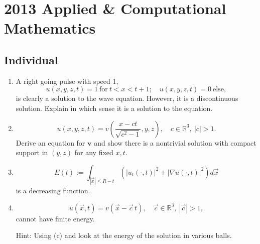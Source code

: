 \section{2013 Applied \& Computational Mathematics}

\subsection{Individual}

\begin{exercise}
\label{applied:2013:1}

\begin{enumerate}
\item[(a)] A right going pulse with speed 1,
\[
u(x,y,z,t)=1\ \text{for}\ t<x<t+1;\quad u(x,y,z,t)=0\ \text{else},
\]
is clearly a solution to the wave equation. However, it is a discontinuous solution. Explain in which sense it is a solution to the equation.
\item[(b)] %
\[
u(x,y,z,t)=v\left(\frac{x-ct}{\sqrt{c^{2}-1}},y,z\right),\quad c\in\mathbb{R}^{3},\ |c|>1.
\]
Derive an equation for $\mathbf{v}$ and show there is a nontrivial solution with compact support in $(y,z)$ for any fixed $x,t$.
\item[(c)] %
\[
E(t):=\int_{|\vec{x}|\leq R-t}\left(|u_{t}(\cdot,t)|^{2}+|\nabla u(\cdot,t)|^{2}\right)d\vec{x}
\]
is a decreasing function.
\item[(d)] %
\[
u(\vec{x},t)=v(\vec{x}-\vec{c}\,t),\quad\vec{c}\in\mathbb{R}^{3},\ |\vec{c}|>1,
\]
cannot have finite energy.

Hint: Using (c) and look at the energy of the solution in various balls.
\end{enumerate}
\end{exercise}

